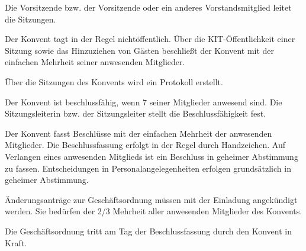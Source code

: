 \documentclass[a4paper, parskip=half, numbers=noenddot]{scrartcl}
\begin{document}
\begin{contract}
Die Vorsitzende bzw. der Vorsitzende oder ein anderes Vorstandsmitglied leitet die Sitzungen.	

Der Konvent tagt in der Regel nichtöffentlich. Über die KIT-Öffentlichkeit einer Sitzung sowie das Hinzuziehen von Gästen beschließt der Konvent mit der einfachen Mehrheit seiner anwesenden Mitglieder.

Über die Sitzungen des Konvents wird ein Protokoll erstellt.

Der Konvent ist beschlussfähig, wenn 7 seiner Mitglieder anwesend sind. Die Sitzungsleiterin bzw. der Sitzungsleiter stellt die Beschlussfähigkeit fest.	

Der Konvent fasst Beschlüsse mit der einfachen Mehrheit der anwesenden Mitglieder. Die
Beschlussfassung erfolgt in der Regel durch Handzeichen. Auf Verlangen eines
anwesenden Mitglieds ist ein Beschluss in geheimer Abstimmung zu fassen. 
Entscheidungen in Personalangelegenheiten erfolgen grundsätzlich in geheimer Abstimmung.

Änderungsanträge zur Geschäftsordnung müssen mit der Einladung angekündigt werden. Sie bedürfen der 2/3 Mehrheit aller anwesenden Mitglieder des Konvents.

Die Geschäftsordnung tritt am Tag der Beschlussfassung durch den Konvent in Kraft.


\end{contract}
\end{document}
